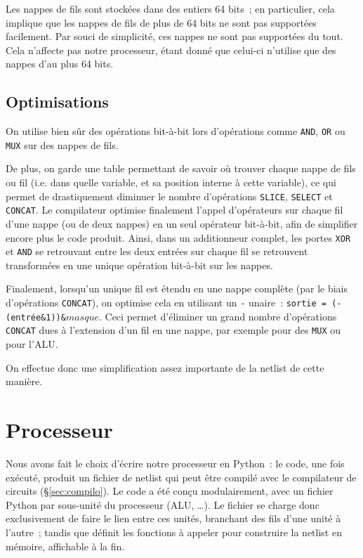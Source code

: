 \documentclass[11pt,a4paper]{article}
\newcommand{\acronym}[1]{\MakeUppercase{#1}}
\newcommand{\relire}{}
\newcommand{\relu}[1]{}
\begin{document}
Les nappes de fils sont stockées dans des entiers 64 bits~; en
particulier, cela implique que les nappes de fils de plus de 64 bits
ne sont pas supportées facilement. Par souci de simplicité, ces nappes
ne sont pas supportées du tout. Cela n'affecte pas notre processeur,
étant donné que celui-ci n'utilise que des nappes d'au plus 64 bits.

\subsection{Optimisations}

On utilise bien sûr des opérations bit-à-bit lors d'opérations comme
\verb!AND!, \verb!OR! ou \verb!MUX! sur des nappes de fils.

De plus, on garde une table permettant de savoir où trouver chaque
nappe de fils ou fil (i.e. dans quelle variable, et sa position
interne à cette variable), ce qui permet de drastiquement diminuer le
nombre d'opérations \verb!SLICE!, \verb!SELECT! et \verb!CONCAT!. Le
compilateur optimise finalement l'appel d'opérateurs sur chaque fil
d'une nappe (ou de deux nappes) en un seul opérateur bit-à-bit, afin
de simplifier encore plus le code produit. Ainsi, dans un additionneur
complet, les portes \verb!XOR! et \verb!AND! se retrouvant entre les
deux entrées sur chaque fil se retrouvent transformées en une unique
opération bit-à-bit sur les nappes.

Finalement, lorsqu'un unique fil est étendu en une nappe complète (par
le biais d'opérations \verb!CONCAT!), on optimise cela en utilisant un
\verb!-! unaire~: \verb!sortie = (-(entrée&1))&!$masque$. Ceci permet
d'éliminer un grand nombre d'opérations \verb!CONCAT! dues à
l'extension d'un fil en une nappe, par exemple pour des \verb!MUX! ou
pour l'\acronym{alu}.

On effectue donc une simplification assez importante de la netlist de cette manière.


\section{Processeur} \label{sec:proc}

\relire
\relu{Théo}

Nous avons fait le choix d'écrire notre processeur en Python~: le code, une fois exécuté, produit un fichier de netlist qui peut être compilé avec le compilateur de circuits (§\ref{sec:compilo}). Le code a été conçu modulairement, avec un fichier Python par sous-unité du processeur (ALU, \ldots). Le fichier  se charge donc exclusivement de faire le lien entre ces unités, \og branchant \fg{} des fils d'une unité à l'autre~; tandis que  définit les fonctions à appeler pour construire la netlist en mémoire, affichable à la fin.
\end{document}
